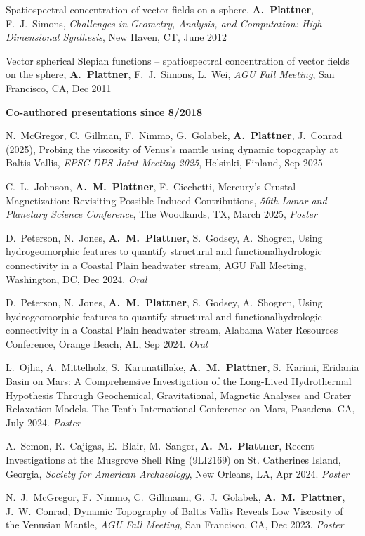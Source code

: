 \documentclass[10pt]{article}
\begin{document}
\spcp
Spatiospectral concentration of vector fields on a sphere,
\textbf{A.~Plattner}, F.~J.~Simons,
\emph{Challenges in Geometry, Analysis, and Computation: High-Dimensional Synthesis}, 
New Haven, CT, June 2012

\spcp
Vector spherical Slepian functions -- spatiospectral concentration of vector fields on the sphere,
\textbf{A.~Plattner}, F.~J.~Simons, L.~Wei,
\emph{AGU Fall Meeting}, San Francisco, CA, Dec 2011


\spc
\textbf{\tsize Co-authored presentations since 8/2018}

\spcp
N.\ McGregor, C.\ Gillman, F.\ Nimmo, G.\ Golabek, \textbf{A.\ Plattner}, J.\ Conrad (2025), Probing the viscosity of Venus's mantle using dynamic topography at Baltis Vallis, \emph{EPSC-DPS Joint Meeting 2025}, Helsinki, Finland, Sep 2025

\spcp
C.\ L.\ Johnson, \textbf{A.\ M.\ Plattner}, F.\ Cicchetti, Mercury's
Crustal Magnetization: Revisiting Possible Induced Contributions,
\emph{56th Lunar and Planetary Science Conference}, The Woodlands, TX,
March 2025, \emph{Poster}


\spcp D.\ Peterson, N.\ Jones, \textbf{A.\ M.\ Plattner}, S.\ Godsey,
A.\ Shogren, Using hydrogeomorphic features to quantify structural and
functionalhydrologic connectivity in a Coastal Plain headwater stream,
AGU Fall Meeting, Washington, DC, Dec 2024. \emph{Oral}

\spcp D.\ Peterson, N.\ Jones, \textbf{A.\ M.\ Plattner}, S.\ Godsey, A.\ Shogren, Using hydrogeomorphic features to quantify structural and functionalhydrologic connectivity in a Coastal Plain headwater stream, Alabama Water Resources Conference, Orange Beach, AL, Sep 2024. \emph{Oral}

\spcp
L.\ Ojha, A.\ Mittelholz, S.\ Karunatillake, \textbf{A.\ M.\ Plattner}, S.\ Karimi, Eridania Basin on Mars: A Comprehensive Investigation of the Long-Lived Hydrothermal Hypothesis Through Geochemical, Gravitational, Magnetic Analyses and Crater Relaxation Models. The Tenth International Conference on Mars, Pasadena, CA, July 2024. \emph{Poster}

\spcp A.\ Semon, R.\ Cajigas, E.\ Blair, M.\ Sanger, \textbf{A.\ M.\ Plattner}, Recent Investigations at the Musgrove Shell Ring (9LI2169) on St. Catherines Island, Georgia, \emph{Society for American Archaeology}, New Orleans, LA, Apr 2024. \emph{Poster}

\spcp N.~J.~McGregor, F.~Nimmo, C.~Gillmann, G.~J.~Golabek, \textbf{A.~M.~Plattner}, J.~W.~Conrad, Dynamic Topography of Baltis Vallis Reveals Low Viscosity of the Venusian Mantle, \emph{AGU Fall Meeting}, San Francisco, CA, Dec 2023. \emph{Poster}
\end{document}
